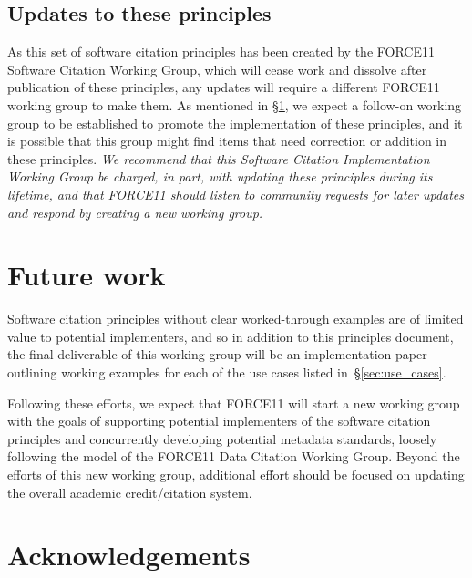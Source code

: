 \documentclass[12pt, oneside]{amsart}
\newcommand{\katznote}[1]{ {\textcolor{blue} { ***DSK: #1 }}} %
\newcommand{\LJHnote}[1]{ {\textcolor{fuschsia} { ***LJH: #1 }}} %
\begin{document}
%

\subsection{Updates to these principles}

As this set of software citation principles has been created by the FORCE11 Software Citation Working Group, which will cease work and dissolve after publication of these principles,
any updates will require a different FORCE11 working group to make them.
As mentioned in \S\ref{sec:futurework}, we expect a follow-on working group to be established to promote the implementation of
these principles, and it is possible that this group might find items that need correction or addition
in these principles.
\textit{We recommend that this Software Citation Implementation Working Group be charged, in part,
with updating these principles during its lifetime, and that FORCE11 should listen to community requests for later updates and respond by creating a new working group.}


\section{Future work}
\label{sec:futurework}

Software citation principles without clear worked-through examples are of
limited value to potential implementers, and so in addition to this principles
document, the final deliverable of this working group will be an implementation
paper outlining working examples for each of the use cases listed in~\S\ref{sec:use_cases}.

Following these efforts, we expect that FORCE11 will start a new working group
with the goals of supporting potential implementers of the software citation
principles and concurrently developing potential metadata standards, loosely following the model
of the FORCE11 Data Citation Working Group.
Beyond the efforts of this new working group, additional effort should be focused on updating the overall academic credit\slash citation system.


\section*{Acknowledgements}
\end{document}
